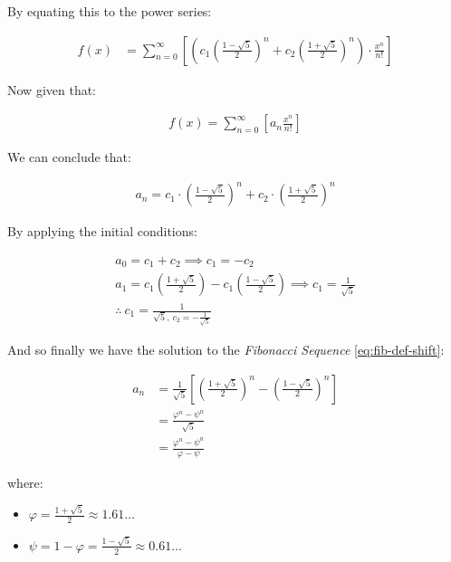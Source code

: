 \documentclass[a4paper,11pt,twoside]{article}
\begin{document}
By equating this to the power series:


\begin{align*}
f\left( x \right)&= \sum^{\infty}_{n= 0}   \left[ \left( c_1\left( \frac{1- \sqrt{5} }{2} \right)^n +  c_2  \left( \frac{1+ \sqrt{5} }{2} \right)^n \right) \cdot  \frac{x^n}{n!} \right]
\end{align*}


Now given that:


\begin{align*}
f\left( x \right)= \sum^{\infty}_{n= 0}   \left[ a_n \frac{x^n}{n!} \right]
\end{align*}


We can conclude that:


\begin{align*}
a_n = c_1\cdot  \left( \frac{1- \sqrt{5} }{2} \right)^n +  c_2 \cdot  \left( \frac{1+  \sqrt{5} }{2} \right)^n
\end{align*}


By applying the initial conditions:


\begin{align*}
a_0= c_1 +  c_2  \implies  c_1= - c_2\\
a_1= c_1 \left( \frac{1+ \sqrt{5} }{2} \right) -  c_1 \left( \frac{1-\sqrt{5} }{2} \right)  \implies  c_1 = \frac{1}{\sqrt{5} }\\
\therefore ~ c_1 = \frac{1}{\sqrt{5}, ~ c_2 = -\frac{1}{\sqrt{5}}}
\end{align*}


And so finally we have the solution to the \emph{Fibonacci Sequence} \ref{eq:fib-def-shift}:


\begin{align}
    a_n &= \frac{1}{\sqrt{5} } \left[ \left( \frac{1+  \sqrt{5} }{2}  \right)^n -  \left( \frac{1- \sqrt{5} }{2} \right)^n \right] \nonumber \\
&= \frac{\varphi^n - \psi^n}{\sqrt{5} } \nonumber\\
&=\frac{\varphi^n -  \psi^n}{\varphi - \psi} \label{eq:fib-sol}
\end{align}


where:

\begin{itemize}
\item \(\varphi = \frac{1+ \sqrt{5} }{2} \approx 1.61\ldots\)
\item \(\psi = 1-\varphi = \frac{1- \sqrt{5} }{2} \approx 0.61\ldots\)
\end{itemize}
\end{document}
